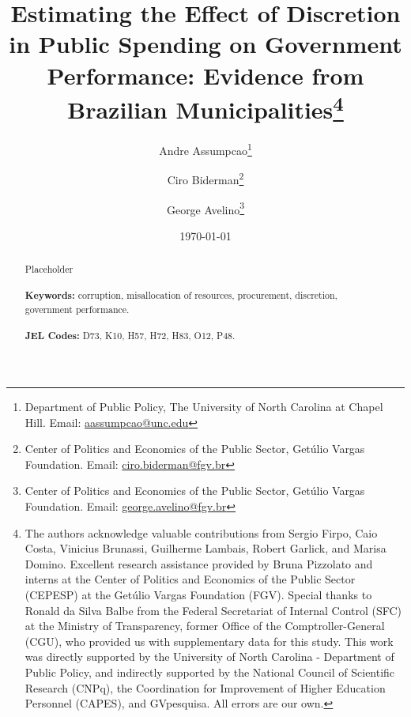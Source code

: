 \documentclass[11pt]{article}
\begin{document}
\begin{titlepage}
\title{Estimating the Effect of Discretion in Public Spending on Government Performance: Evidence from Brazilian Municipalities\thanks{The authors acknowledge valuable contributions from Sergio Firpo, Caio Costa, Vinicius Brunassi, Guilherme Lambais,
Robert Garlick, and Marisa Domino. Excellent research assistance provided by Bruna Pizzolato and interns at the Center of Politics and Economics of the Public Sector (CEPESP) at the Getúlio Vargas Foundation (FGV). Special thanks to Ronald da Silva Balbe from the Federal Secretariat of Internal Control (SFC) at the Ministry of Transparency, former Office of the Comptroller-General (CGU), who provided us with supplementary data for this study. This work was directly supported by the University of North Carolina - Department of Public Policy, and indirectly supported by the National Council of Scientific Research (CNPq), the Coordination for Improvement of Higher Education Personnel (CAPES), and GVpesquisa. All errors are our own.}}
\author{Andre Assumpcao\thanks{Department of Public Policy, The University of North Carolina at Chapel Hill. Email: \href{mailto:aassumpcao@unc.edu}{aassumpcao@unc.edu}} \and Ciro Biderman\thanks{Center of Politics and Economics of the Public Sector, Getúlio Vargas Foundation. Email: \href{mailto:ciro.biderman@fgv.br}{ciro.biderman@fgv.br}} \and George Avelino\thanks{Center of Politics and Economics of the Public Sector, Getúlio Vargas Foundation. Email: \href{mailto:george.avelino@fgv.br}{george.avelino@fgv.br}}}
\date{\today}
\maketitle
\begin{abstract}
\noindent Placeholder\\
\vspace{0in}\\
\noindent\textbf{Keywords:} corruption, misallocation of resources, procurement, discretion, government performance.\\
\vspace{0in}\\
\noindent\textbf{JEL Codes:} D73, K10, H57, H72, H83, O12, P48.\\

\bigskip
\end{abstract}
\setcounter{page}{0}
\thispagestyle{empty}
\end{titlepage}
\pagebreak \newpage

\end{document}
